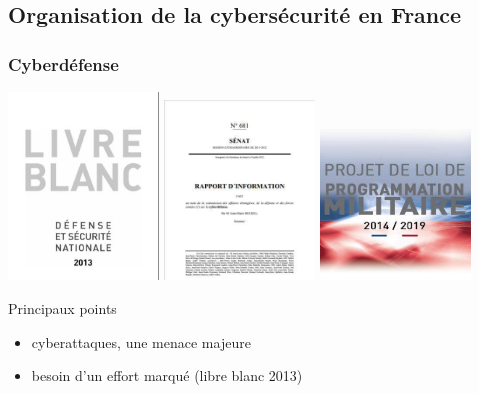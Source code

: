 \begin{reveals}
		
\maketitle

\section{Organisation de la cybersécurité en France}

\begin{frame}
  \frametitle{Cyberdéfense}

  \vfill
  \begin{center}
    \includegraphics[width=0.3\textwidth]{images/livre_blanc_defense.jpg}%
    \includegraphics[width=0.3\textwidth]{images/rapport_information_senat.jpg}%
    \includegraphics[width=0.3\textwidth]{images/projet_loi_programmation_militaire-2014-2019.jpg}%
  \end{center}

  \vfill
  \begin{block}{Principaux points}
    \begin{itemize}
    \item cyberattaques, une menace majeure
    \item besoin d'un effort marqué (libre blanc 2013)
    \end{itemize}
  \end{block}


\end{frame}
\end{reveals}
